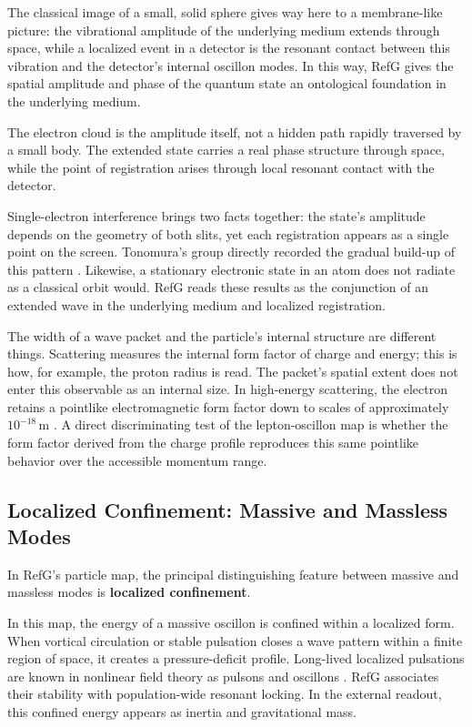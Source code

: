 \documentclass[11pt,a4paper]{article}
\begin{document}
The classical image of a small, solid sphere gives way here to a membrane-like picture: the vibrational amplitude of the underlying medium extends through space, while a localized event in a detector is the resonant contact between this vibration and the detector's internal oscillon modes. In this way, RefG gives the spatial amplitude and phase of the quantum state an ontological foundation in the underlying medium.

The electron cloud is the amplitude itself, not a hidden path rapidly traversed by a small body. The extended state carries a real phase structure through space, while the point of registration arises through local resonant contact with the detector.

Single-electron interference brings two facts together: the state's amplitude depends on the geometry of both slits, yet each registration appears as a single point on the screen. Tonomura's group directly recorded the gradual build-up of this pattern \citep{tonomura1989}. Likewise, a stationary electronic state in an atom does not radiate as a classical orbit would. RefG reads these results as the conjunction of an extended wave in the underlying medium and localized registration.

The width of a wave packet and the particle's internal structure are different things. Scattering measures the internal form factor of charge and energy; this is how, for example, the proton radius is read. The packet's spatial extent does not enter this observable as an internal size. In high-energy scattering, the electron retains a pointlike electromagnetic form factor down to scales of approximately $10^{-18}\,\mathrm m$ \citep{navas2024}. A direct discriminating test of the lepton-oscillon map is whether the form factor derived from the charge profile reproduces this same pointlike behavior over the accessible momentum range.

\subsection{Localized Confinement: Massive and Massless Modes}

In RefG's particle map, the principal distinguishing feature between massive and massless modes is \textbf{localized confinement}.

In this map, the energy of a massive oscillon is confined within a localized form. When vortical circulation or stable pulsation closes a wave pattern within a finite region of space, it creates a pressure-deficit profile. Long-lived localized pulsations are known in nonlinear field theory as pulsons and oscillons \citep{bogolyubsky1976,gleiser1994,copeland1995}. RefG associates their stability with population-wide resonant locking. In the external readout, this confined energy appears as inertia and gravitational mass.
\end{document}
